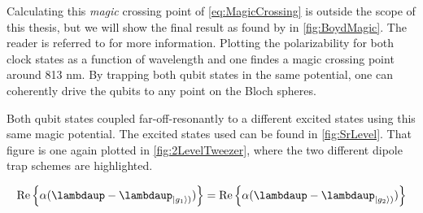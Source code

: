 Calculating this \textit{magic} crossing point of \cref{eq:MagicCrossing} is outside the scope of this thesis, but we will show the final result as found by \cite{Boyd2007} in \cref{fig:BoydMagic}. The reader is referred to \cite{Madjarov2020,Boyd2007} for more information. 
Plotting the polarizability for both clock states as a function of wavelength and one findes a magic crossing point around 813 nm. 
By trapping both qubit states in the same potential, one can coherently drive the qubits to any point on the Bloch spheres. 

Both qubit states coupled far-off-resonantly to a different excited states using this same magic potential. 
The excited states used can be found in \cref{fig:SrLevel}. 
That figure is one again plotted in \cref{fig:2LevelTweezer}, where the two different dipole trap schemes are highlighted.

\begin{equation}\label{eq:MagicCrossing}
    \operatorname{Re}\left\{\alpha(\lambdaup-\lambdaup_{\ket{g_1})})\right\} = 
    \operatorname{Re}\left\{\alpha(\lambdaup-\lambdaup_{\ket{g_2})})\right\}
\end{equation}





	

